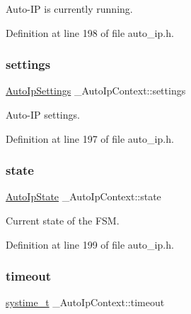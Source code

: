 Auto-\/\+IP is currently running. 



Definition at line 198 of file auto\+\_\+ip.\+h.

\mbox{\label{struct__AutoIpContext_a67a8a13ceb66aa891cd7164dffbaeac7}} 
\subsubsection{\texorpdfstring{settings}{settings}}
{\footnotesize\ttfamily \hyperlink{structAutoIpSettings}{Auto\+Ip\+Settings} \+\_\+\+Auto\+Ip\+Context\+::settings}



Auto-\/\+IP settings. 



Definition at line 197 of file auto\+\_\+ip.\+h.

\mbox{\label{struct__AutoIpContext_aa11235cf8b7769f2ff5312e44e7b5078}} 
\subsubsection{\texorpdfstring{state}{state}}
{\footnotesize\ttfamily \hyperlink{auto__ip_8h_a76eb539c3a130a13ca891530f25f4625}{Auto\+Ip\+State} \+\_\+\+Auto\+Ip\+Context\+::state}



Current state of the F\+SM. 



Definition at line 199 of file auto\+\_\+ip.\+h.

\mbox{\label{struct__AutoIpContext_abc5126c18c57397b94e847c5c71b563a}} 
\subsubsection{\texorpdfstring{timeout}{timeout}}
{\footnotesize\ttfamily \hyperlink{compiler__port_8h_ae3e32a98d431a02106616da3071832dd}{systime\+\_\+t} \+\_\+\+Auto\+Ip\+Context\+::timeout}



